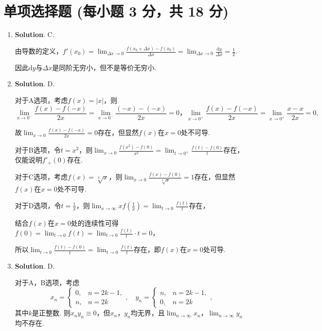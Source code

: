 \documentclass[../main.tex]{subfiles}
\begin{document}
\section{单项选择题 (每小题 3 分，共 18 分)}
\begin{enumerate}
    \item \textbf{Solution}. C.

          由导数的定义，$f'(x_{0})=\lim_{\Delta x\to0}\frac{f(x_{0}+\Delta x)-f(x_{0})}{\Delta
                  x}=\lim_{\Delta x\to0}\frac{\mathrm{d}y}{\Delta x}=\frac{1}{2}$.

          因此$\mathrm{d}y$与$\Delta x$是同阶无穷小，但不是等价无穷小.

    \item \textbf{Solution}. D.

          对于A选项，考虑$f(x)=|x|$，则
          \[
              \lim_{x\to0^-}\frac{f(x)-f(-x)}{2x}=\lim_{x\to0^-}\frac{(-x)-(-x)}{2x}= 0
              \text{，}\lim_{x\to0^+}\frac{f(x)-f(-x)}{2x}=\lim_{x\to0^+}\frac{x-x}{2x}
              =0,
          \]

          故$\lim_{x\to0}\frac{f(x)-f(-x)}{2x}=0$存在，但显然$f(x)$在$x=0$处不可导.

          对于B选项，令$t=x^{2}$，则$\lim_{x\to0}\frac{f(x^{2})-f(0)}{x^{2}}=\lim_{t\to0^+}
              \frac{f(t)-f(0)}{t}$存在，仅能说明$f'_{+}(0)$存在.

          对于C选项，考虑$f(x)=\sqrt[3]{x}$，则$\lim_{x\to0}\frac{f(x)-f(0)}{\sqrt[3]{x}}
              =1$存在，但显然$f(x)$在$x=0$处不可导.

          对于D选项，令$t=\frac{1}{x}$，则$\lim_{x\to\infty}x f\left(\frac{1}{x}\right
              )=\lim_{t\to0}\frac{f(t)}{t}$存在，

          结合$f(x)$在$x=0$处的连续性可得$f(0)=\lim_{t\to0}f(t)=\lim_{t\to0}\frac{f(t)}{t}
              \cdot t=0$，

          所以$\lim_{t\to0}\frac{f(t)-f(0)}{t}=\lim_{t\to0}\frac{f(t)}{t}$存在，即$f(
              x)$在$x=0$处可导.

    \item \textbf{Solution}. D.

          对于A，B选项，考虑
          \[
              x_{n}=
              \begin{cases}
                  0, & n=2k-1, \\
                  n, & n=2k
              \end{cases},\quad y_{n}=
              \begin{cases}
                  n, & n=2k-1, \\
                  0, & n=2k
              \end{cases},
          \]
          其中$k$是正整数. 则$x_{n} y_{n}\equiv0$，但$x_{n}$，$y_{n}$均无界，且$\lim_{n\to\infty}x_{n}$，$\lim
              _{n\to\infty}y_{n}$均不存在.


\end{enumerate}
\end{document}
